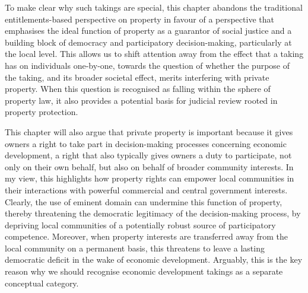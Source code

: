 To make clear why such takings are special, this chapter abandons the traditional entitlements-based perspective on property in favour of a perspective that emphasises the ideal function of property as a guarantor of social justice and a building block of democracy and participatory decision-making, particularly at the local level. This allows us to shift attention away from the effect that a taking has on individuals one-by-one, towards the question of whether the purpose of the taking, and its broader societal effect, merits interfering with private property. When this question is recognised as falling within the sphere of property law, it also provides a potential basis for judicial review rooted in property protection.

This chapter will also argue that private property is important because it gives owners a right to take part in decision-making processes concerning economic development, a right that also typically gives owners a duty to participate, not only on their own behalf, but also on behalf of broader community interests. In my view, this highlights how property rights can empower local communities in their interactions with powerful commercial and central government interests. Clearly, the use of eminent domain can undermine this function of property, thereby threatening the democratic legitimacy of the decision-making process, by depriving local communities of a potentially robust source of participatory competence. Moreover, when property interests are transferred away from the local community on a permanent basis, this threatens to leave a lasting democratic deficit in the wake of economic development. Arguably, this is the key reason why we should recognise economic development takings as a separate conceptual category.

